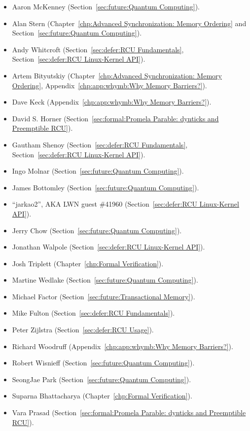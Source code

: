\begin{itemize}
\item	Aaron McKenney (Section~\ref{sec:future:Quantum Computing}).
\item	Alan Stern (Chapter~\ref{chp:Advanced Synchronization: Memory Ordering}
	and Section~\ref{sec:future:Quantum Computing}).
\item	Andy Whitcroft (Section~\ref{sec:defer:RCU Fundamentals},
	Section~\ref{sec:defer:RCU Linux-Kernel API}).
\item	Artem Bityutskiy (Chapter~\ref{chp:Advanced Synchronization: Memory Ordering},
	Appendix~\ref{chp:app:whymb:Why Memory Barriers?}).
\item	Dave Keck (Appendix~\ref{chp:app:whymb:Why Memory Barriers?}).
\item	David S. Horner
	(Section~\ref{sec:formal:Promela Parable: dynticks and Preemptible RCU}).
\item	Gautham Shenoy (Section~\ref{sec:defer:RCU Fundamentals},
	Section~\ref{sec:defer:RCU Linux-Kernel API}).
\item	Ingo Molnar (Section~\ref{sec:future:Quantum Computing}).
\item	James Bottomley (Section~\ref{sec:future:Quantum Computing}).
\item	``jarkao2'', AKA LWN guest \#41960 (Section~\ref{sec:defer:RCU Linux-Kernel API}).
\item	Jerry Chow (Section~\ref{sec:future:Quantum Computing}).
\item	Jonathan Walpole (Section~\ref{sec:defer:RCU Linux-Kernel API}).
\item	Josh Triplett (Chapter~\ref{chp:Formal Verification}).
\item	Martine Wedlake (Section~\ref{sec:future:Quantum Computing}).
\item	Michael Factor (Section~\ref{sec:future:Transactional Memory}).
\item	Mike Fulton (Section~\ref{sec:defer:RCU Fundamentals}).
\item	Peter Zijlstra
	(Section~\ref{sec:defer:RCU Usage}). %
\item	Richard Woodruff (Appendix~\ref{chp:app:whymb:Why Memory Barriers?}).
\item	Robert Wisnieff (Section~\ref{sec:future:Quantum Computing}).
\item	SeongJae Park (Section~\ref{sec:future:Quantum Computing}).
\item	Suparna Bhattacharya (Chapter~\ref{chp:Formal Verification}).
\item	Vara Prasad
	(Section~\ref{sec:formal:Promela Parable: dynticks and Preemptible RCU}).
\end{itemize}

